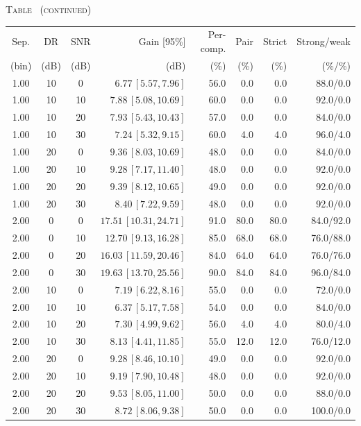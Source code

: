\begin{center}
\textsc{Table \thetable\ (continued)}\par\smallskip
\begin{tabular}{cccrrrrr}
\toprule
Sep. & DR & SNR & Gain [95\%] & Per-comp. & Pair & Strict & Strong/weak \\
(bin) & (dB) & (dB) & (dB) & (\%) & (\%) & (\%) & (\%/\%) \\
\midrule
1.00 & 10 & 0 & $6.77\,[5.57,7.96]$ & 56.0 & 0.0 & 0.0 & 88.0/0.0 \\
1.00 & 10 & 10 & $7.88\,[5.08,10.69]$ & 60.0 & 0.0 & 0.0 & 92.0/0.0 \\
1.00 & 10 & 20 & $7.93\,[5.43,10.43]$ & 57.0 & 0.0 & 0.0 & 84.0/0.0 \\
1.00 & 10 & 30 & $7.24\,[5.32,9.15]$ & 60.0 & 4.0 & 4.0 & 96.0/4.0 \\
1.00 & 20 & 0 & $9.36\,[8.03,10.69]$ & 48.0 & 0.0 & 0.0 & 84.0/0.0 \\
1.00 & 20 & 10 & $9.28\,[7.17,11.40]$ & 48.0 & 0.0 & 0.0 & 92.0/0.0 \\
1.00 & 20 & 20 & $9.39\,[8.12,10.65]$ & 49.0 & 0.0 & 0.0 & 92.0/0.0 \\
1.00 & 20 & 30 & $8.40\,[7.22,9.59]$ & 48.0 & 0.0 & 0.0 & 92.0/0.0 \\
2.00 & 0 & 0 & $17.51\,[10.31,24.71]$ & 91.0 & 80.0 & 80.0 & 84.0/92.0 \\
2.00 & 0 & 10 & $12.70\,[9.13,16.28]$ & 85.0 & 68.0 & 68.0 & 76.0/88.0 \\
2.00 & 0 & 20 & $16.03\,[11.59,20.46]$ & 84.0 & 64.0 & 64.0 & 76.0/76.0 \\
2.00 & 0 & 30 & $19.63\,[13.70,25.56]$ & 90.0 & 84.0 & 84.0 & 96.0/84.0 \\
2.00 & 10 & 0 & $7.19\,[6.22,8.16]$ & 55.0 & 0.0 & 0.0 & 72.0/0.0 \\
2.00 & 10 & 10 & $6.37\,[5.17,7.58]$ & 54.0 & 0.0 & 0.0 & 84.0/0.0 \\
2.00 & 10 & 20 & $7.30\,[4.99,9.62]$ & 56.0 & 4.0 & 4.0 & 80.0/4.0 \\
2.00 & 10 & 30 & $8.13\,[4.41,11.85]$ & 55.0 & 12.0 & 12.0 & 76.0/12.0 \\
2.00 & 20 & 0 & $9.28\,[8.46,10.10]$ & 49.0 & 0.0 & 0.0 & 92.0/0.0 \\
2.00 & 20 & 10 & $9.19\,[7.90,10.48]$ & 48.0 & 0.0 & 0.0 & 92.0/0.0 \\
2.00 & 20 & 20 & $9.53\,[8.05,11.00]$ & 50.0 & 0.0 & 0.0 & 88.0/0.0 \\
2.00 & 20 & 30 & $8.72\,[8.06,9.38]$ & 50.0 & 0.0 & 0.0 & 100.0/0.0 \\
\bottomrule
\end{tabular}
\end{center}
\endgroup
